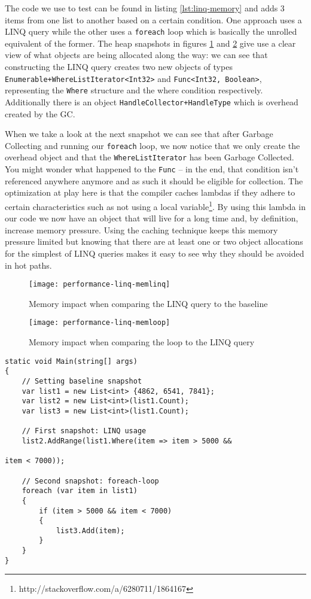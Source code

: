 The code we use to test can be found in listing \ref{lst:linq-memory} and adds 3 items from one list to another based on a certain condition. One approach uses a LINQ query while the other uses a \verb|foreach| loop which is basically the unrolled equivalent of the former. The heap snapshots in figures \ref{img:performance-linq-memlinq} and \ref{img:performance-linq-memloop} give use a clear view of what objects are being allocated along the way: we can see that constructing the LINQ query creates two new objects of types \verb|Enumerable+WhereListIterator<Int32>| and \verb|Func<Int32, Boolean>|, representing the \verb|Where| structure and the where condition respectively. Additionally there is an object \verb|HandleCollector+HandleType| which is overhead created by the GC. 

When we take a look at the next snapshot we can see that after Garbage Collecting and running our \verb|foreach| loop, we now notice that we only create the overhead object and that the \verb|WhereListIterator| has been Garbage Collected. You might wonder what happened to the \verb|Func| -- in the end, that condition isn't referenced anywhere anymore and as such it should be eligible for collection. The optimization at play here is that the compiler caches lambdas if they adhere to certain characteristics such as not using a local variable\footnote{http://stackoverflow.com/a/6280711/1864167}. By using this lambda in our code we now have an object that will live for a long time and, by definition, increase memory pressure. Using the caching technique keeps this memory pressure limited but knowing that there are at least one or two object allocations for the simplest of LINQ queries makes it easy to see why they should be avoided in hot paths.


\begin{figure}
\centering
\texttt{[image: performance-linq-memlinq]}
\caption{Memory impact when comparing the LINQ query to the baseline}
\label{img:performance-linq-memlinq}
\end{figure}

\begin{figure}[h]
\centering
\texttt{[image: performance-linq-memloop]}
\caption{Memory impact when comparing the loop to the LINQ query}
\label{img:performance-linq-memloop}
\end{figure}

\begin{lstlisting}[label={lst:linq-memory}]
static void Main(string[] args)
{
    // Setting baseline snapshot
    var list1 = new List<int> {4862, 6541, 7841};
    var list2 = new List<int>(list1.Count);
    var list3 = new List<int>(list1.Count);

    // First snapshot: LINQ usage
    list2.AddRange(list1.Where(item => item > 5000 && 
																			 item < 7000));

    // Second snapshot: foreach-loop
    foreach (var item in list1)
    {
        if (item > 5000 && item < 7000)
        {
            list3.Add(item);
        }
    }
}
\end{lstlisting}
